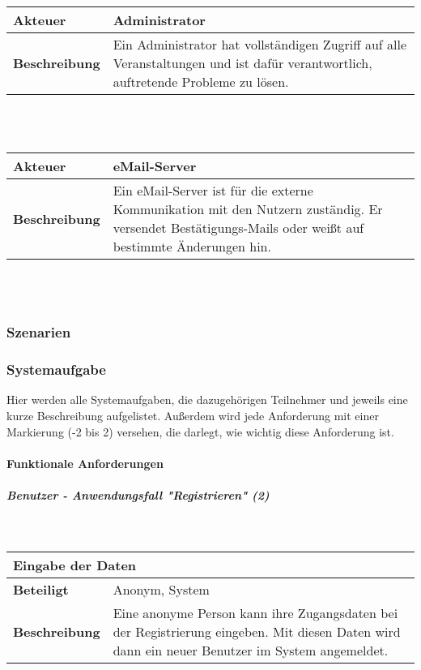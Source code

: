 \documentclass[12pt,a4paper]{article}
\begin{document}
\begin{tabular}{l p{10cm}}
\textbf{Akteuer} & Administrator \\ 
\hline \textbf{Beschreibung} & Ein Administrator hat vollständigen Zugriff auf alle Veranstaltungen und ist dafür verantwortlich, auftretende Probleme zu lösen. \\ 
\hline 
\end{tabular}\\\\

\begin{tabular}{l p{10cm}}
\textbf{Akteuer} & eMail-Server \\ 
\hline \textbf{Beschreibung} & Ein eMail-Server ist für die externe Kommunikation mit den Nutzern zuständig. Er versendet Bestätigungs-Mails oder weißt auf bestimmte Änderungen hin. \\ 
\hline 
\end{tabular}\\\\

\subsubsection{Szenarien}
\subsubsection{Systemaufgabe}
Hier werden alle Systemaufgaben, die dazugehörigen Teilnehmer und jeweils eine kurze Beschreibung aufgelistet. Außerdem wird jede Anforderung mit einer Markierung (-2 bis 2) versehen, die darlegt, wie wichtig diese Anforderung ist.
\newpage
\paragraph{Funktionale Anforderungen}
\subparagraph{Benutzer - Anwendungsfall "Registrieren" (2)}\mbox{}\\

\begin{tabular}{l p{10cm}}
\multicolumn{2}{l}{\textbf{Eingabe der Daten}} \\ \hline
\textbf{Beteiligt} & Anonym, System \\ \hline 
\textbf{Beschreibung} & Eine anonyme Person kann ihre Zugangsdaten bei der Registrierung eingeben. Mit diesen Daten wird dann ein neuer Benutzer im System angemeldet.\\ 
\hline 
\end{tabular}\\\\
\end{document}
